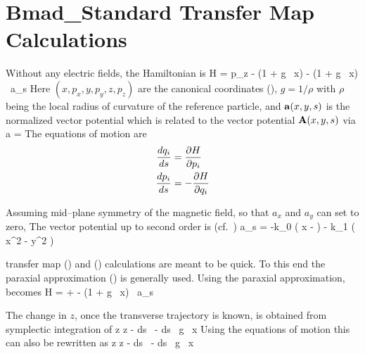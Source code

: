\documentclass{book}
\begin{document}
\setlength{\parskip}{\dPar}
\setlength{\parindent}{0ex}

\newcommand{\bfM}{{\bf M}}
\newcommand{\bfK}{{\bf K}}

\section{Bmad\_Standard Transfer Map Calculations}
\label{s:bmad_standard}

Without any electric fields, the Hamiltonian is
\Begineq
  H = p_z - (1 + g \, x)  - 
  (1 + g \, x) \, a_s
  \label{h1gx1}
\Endeq
Here $(x, p_x, y, p_y, z, p_z)$ are the canonical coordinates
(), $g = 1/\rho$ with $\rho$ being the
local radius of curvature of the reference particle, and
${\bf a}(x,y,s)$ is the normalized vector potential which is related to
the vector potential ${\bf A}(x,y,s)$ via
\Begineq
  \Bf a = 
\Endeq
The equations of motion are
\begin{align}
  \frac{dq_i}{ds} &= \frac{\partial H}{\partial p_i} \nonumber \\
  \frac{dp_i}{ds} &= -\frac{\partial H}{\partial q_i}
  \label{rshp}
\end{align}

Assuming mid--plane symmetry of the magnetic field, so
that $a_x$ and $a_y$ can set to zero\cite{b:madphysics}, The vector
potential up to second order is (cf.~)
\Begineq
  a_s = -k_0 \left( x -  \right) -
   k_1 \left( x^2 - y^2 \right)
\Endeq

 transfer map () and ()
calculations are meant to be quick. To this end the paraxial
approximation () is generally used.  Using the paraxial
approximation,  becomes
\Begineq
  H =  +  - 
  (1 + g \, x) \, a_s 
  \label{hpapa}
\Endeq

The change in $z$, once the transverse trajectory is
known, is obtained from symplectic integration of  
\Begineq
  z \rightarrow z -  \int \! ds \, 
  \left[ (p_x - a_x)^2 + (p_y - a_y)^2 \right] - \int \! ds \, g \, x
  \label{zz121p}
\Endeq
Using the equations of motion  this can also be rewritten as
\Begineq
  z \rightarrow z -  \int \! ds \, 
   - 
  \int \! ds \, g \, x
  \label{zz12sx}
\Endeq
\end{document}
